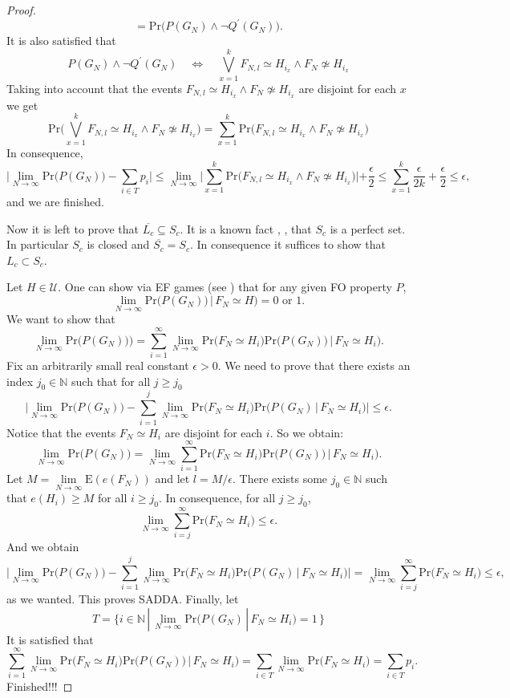 \documentclass[11pt,notitlepage,a4paper]{article}
\theoremstyle{definition}
\newcommand{\N}{\mathbb{N}}
\newcommand{\LN}{\lim\limits_{N\to \infty}}
\begin{document}
\begin{proof}
\[	=
	\mathrm{Pr}\big(P(G_N) \wedge \neg Q^\prime(G_N) \big).
	\]
	It is also satisfied that
	\[
	P(G_N) \wedge \neg Q^\prime(G_N) \quad \iff \quad 
	\bigvee_{x=1}^k F_{N,l}\simeq H_{i_x} \wedge 
	F_N\not\simeq H_{i_x} 
	\]
	Taking into account that the events 
	$F_{N,l}\simeq H_{i_x} \wedge 
	F_N\not\simeq H_{i_x}$ are disjoint for each $x$
	we get
	\[
	\mathrm{Pr}\big(\bigvee_{x=1}^k F_{N,l}
	\simeq H_{i_x} \wedge 
	F_N\not\simeq H_{i_x} \big)=
	\sum_{x=1}^{k} \mathrm{Pr}\big( F_{N,l}
	\simeq H_{i_x} \wedge 
	F_N\not\simeq H_{i_x} \big)
	\]
	In consequence,
	\[
	\big|\LN \mathrm{Pr}\big(P(G_N)\big)- \sum_{i\in T}p_i \big|
	\leq
	\LN	\big|\sum_{x=1}^{k} \mathrm{Pr}\big( F_{N,l}
	\simeq H_{i_x} \wedge 
	F_N\not\simeq H_{i_x} \big)|
	+ \frac{\epsilon}{2}\leq
	\sum_{x=1}^{k} \frac{\epsilon}{2k} + \frac{\epsilon}{2}
	\leq \epsilon,
	\]
	and we are finished. \par
	Now it is left to prove that
	$\overline{L_c}\subseteq S_c$. 
	It is a known fact \cite{kakeya1914partial}, 
	\cite{hornich1941beliebige}, \cite{nymann2000paper}
	that $S_c$ is a perfect set. In particular
	$S_c$ is closed and $\overline{S_c}=S_c$. In
	consequence it suffices to show that
	$L_c\subset S_c$.\par
	Let $H\in \mathcal{U}$.
	One can show via EF games (see \cite{mastertesisalberto}) 
	that for any given FO property $P$,
 	\[
 	\LN \mathrm{Pr}\big( P(G_N)) \, | \, F_N\simeq H \big)
 	= 0 \text{ or } 1.
 	\]
 	We want to show that 
 	\[
 	\LN \mathrm{Pr}\big( P(G_N)) \big)
 	= \sum_{i=1}^\infty \LN \mathrm{Pr}\big( F_N \simeq H_i \big)
 	\mathrm{Pr}\big( P(G_N)) \, | \, F_N\simeq H_i \big).
 	\]
 	Fix an arbitrarily small real constant $\epsilon>0$. We
 	need to prove that there exists an index $j_0\in \N$ such
 	that for all $j\geq j_0$
 	\[
 	\big|\LN \mathrm{Pr}\big( P(G_N) \big) -
 	\sum_{i=1}^j \LN \mathrm{Pr}\big( F_N \simeq H_i \big)
 	\mathrm{Pr}\big( P(G_N) \, | \, F_N\simeq H_i \big)\big|\leq 
 	\epsilon.
 	\]
	Notice that the events $F_N\simeq H_i$ are disjoint for each
	$i$. So we obtain:
	\[
	\LN \mathrm{Pr}\big( P(G_N)\big)=
	\LN \sum_{i=1}^\infty \mathrm{Pr}\big( F_N \simeq H_i \big)
	\mathrm{Pr}\big( P(G_N)) \, | \, F_N\simeq H_i \big).	
	\] 
	Let $M=\LN \mathrm{E}(e(F_N))$ and let $l=M/\epsilon$.
	There exists some $j_0\in \N$ such that $e(H_i)\geq M$ 
	for all $i\geq j_0$. In consequence, for all $j\geq j_0$,
	\[
	\LN \sum_{i=j}^{\infty} \mathrm{Pr}\big( F_N \simeq H_i \big) \leq 
	\epsilon.	
	\]
	And we obtain
	\[
	\big|\LN \mathrm{Pr}\big( P(G_N) \big) -
	\sum_{i=1}^j \LN \mathrm{Pr}\big( F_N \simeq H_i \big)
	\mathrm{Pr}\big( P(G_N) \, | \, F_N\simeq H_i \big)\big|=
	\LN \sum_{i=j}^{\infty} \mathrm{Pr}\big( F_N \simeq H_i \big) \leq 
	\epsilon,
	\]
	as we wanted. This proves SADDA. Finally, let 
	\[
	T=\{i\in \N \, | \, \LN \mathrm{Pr}
	\big( P(G_N) \, | \, F_N\simeq H_i \big) = 1 \,	
	\}
	\]
	It is satisfied that 
	\[
	\sum_{i=1}^\infty \LN \mathrm{Pr}\big( F_N \simeq H_i \big)
	\mathrm{Pr}\big( P(G_N)) \, | \, F_N\simeq H_i \big)=
	\sum_{i\in T} \LN \mathrm{Pr}\big( F_N \simeq H_i \big)
	= \sum_{i\in T} p_i.
	\]
	Finished!!!
\end{proof}





\end{document}
